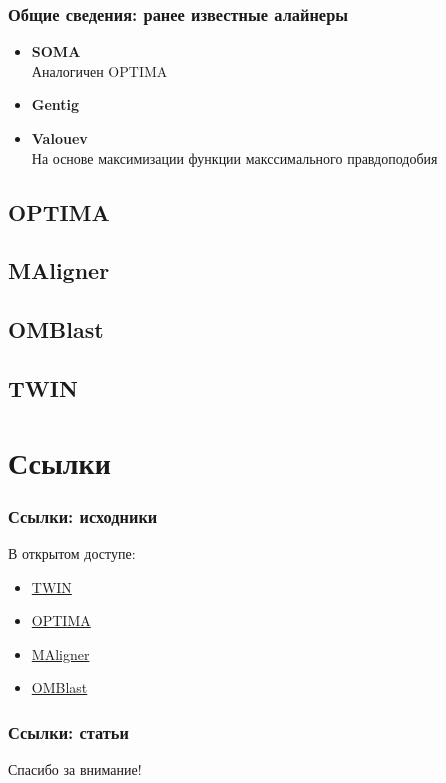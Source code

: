 \documentclass{beamer}
\begin{document}
\begin{frame}
\frametitle{Общие сведения: ранее известные алайнеры}
\begin{itemize}
  \item \textbf{SOMA\nocite{SOMA}} \\
  Аналогичен OPTIMA
  \item \textbf{Gentig} \\
  \item \textbf{Valouev} \\
  На основе максимизации функции макссимального правдоподобия
\end{itemize}
\end{frame}

\subsection{OPTIMA}


\subsection{MAligner}


\subsection{OMBlast}


\subsection{TWIN}


\section{Ссылки}
\begin{frame}
\frametitle{Ссылки: исходники}
В открытом доступе:
\begin{itemize}
  \item \href{http://www.cs.colostate.edu/twin/download.html}{TWIN}
  \item \href{https://github.com/verznet/OPTIMA}{OPTIMA}
  \item \href{https://github.com/LeeMendelowitz/maligner}{MAligner}
  \item \href{https://github.com/aldenleung/OMBlast}{OMBlast}
\end{itemize}
\end{frame}

\begin{frame}[t,allowframebreaks]
\frametitle{Ссылки: статьи}
\printbibliography
\end{frame}

\begin{frame}

\begin{center}
\Huge Спасибо за внимание!
\end{center}

\end{frame}
\end{document}
